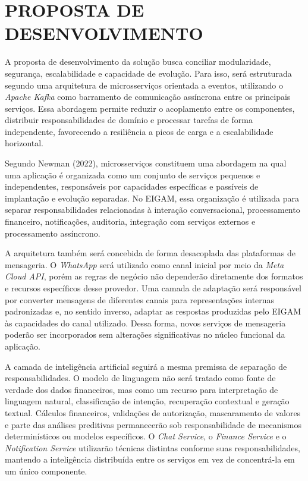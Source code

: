 \chapter{PROPOSTA DE DESENVOLVIMENTO}

A proposta de desenvolvimento da solução busca conciliar modularidade, segurança, escalabilidade e capacidade de evolução. Para isso, será estruturada segundo uma arquitetura de microsserviços orientada a eventos, utilizando o \textit{Apache Kafka} como barramento de comunicação assíncrona entre os principais serviços. Essa abordagem permite reduzir o acoplamento entre os componentes, distribuir responsabilidades de domínio e processar tarefas de forma independente, favorecendo a resiliência a picos de carga e a escalabilidade horizontal.

Segundo Newman (2022), microsserviços constituem uma abordagem na qual uma aplicação é organizada como um conjunto de serviços pequenos e independentes, responsáveis por capacidades específicas e passíveis de implantação e evolução separadas. No EIGAM, essa organização é utilizada para separar responsabilidades relacionadas à interação conversacional, processamento financeiro, notificações, auditoria, integração com serviços externos e processamento assíncrono.

A arquitetura também será concebida de forma desacoplada das plataformas de mensageria. O \textit{WhatsApp} será utilizado como canal inicial por meio da \textit{Meta Cloud API}, porém as regras de negócio não dependerão diretamente dos formatos e recursos específicos desse provedor. Uma camada de adaptação será responsável por converter mensagens de diferentes canais para representações internas padronizadas e, no sentido inverso, adaptar as respostas produzidas pelo EIGAM às capacidades do canal utilizado. Dessa forma, novos serviços de mensageria poderão ser incorporados sem alterações significativas no núcleo funcional da aplicação.

A camada de inteligência artificial seguirá a mesma premissa de separação de responsabilidades. O modelo de linguagem não será tratado como fonte de verdade dos dados financeiros, mas como um recurso para interpretação de linguagem natural, classificação de intenção, recuperação contextual e geração textual. Cálculos financeiros, validações de autorização, mascaramento de valores e parte das análises preditivas permanecerão sob responsabilidade de mecanismos determinísticos ou modelos específicos. O \textit{Chat Service}, o \textit{Finance Service} e o \textit{Notification Service} utilizarão técnicas distintas conforme suas responsabilidades, mantendo a inteligência distribuída entre os serviços em vez de concentrá-la em um único componente.

